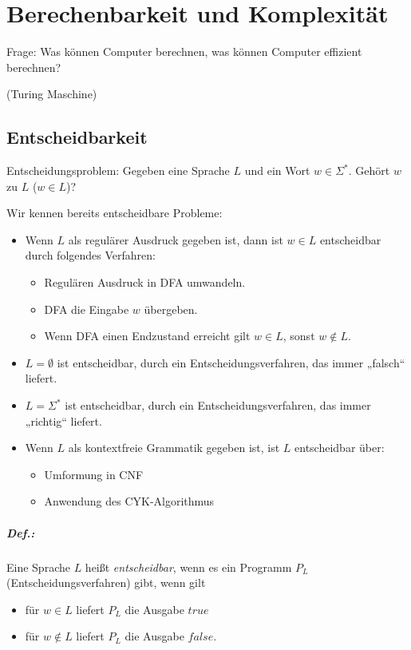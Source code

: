 \chapter{Berechenbarkeit und Komplexität}
Frage: Was können Computer berechnen, was können Computer effizient berechnen?\\
 (Turing Maschine)
\section{Entscheidbarkeit}
Entscheidungsproblem: Gegeben eine Sprache $L$ und ein Wort $w\in \Sigma^*$. Gehört $w$ zu $L$ ($w\in L$)?

Wir kennen bereits entscheidbare Probleme:
\begin{itemize}
\item Wenn $L$ als regulärer Ausdruck gegeben ist, dann ist $w\in L$ entscheidbar durch folgendes Verfahren: 
\begin{itemize}
\item Regulären Ausdruck in DFA umwandeln.
\item DFA die Eingabe $w$ übergeben.
\item Wenn DFA einen Endzustand erreicht gilt $w\in L$, sonst $w\not \in L$.
\end{itemize}
\item $L=\emptyset$ ist entscheidbar, durch ein Entscheidungsverfahren, das immer „falsch“ liefert.
\item $L=\Sigma^*$ ist entscheidbar, durch ein Entscheidungsverfahren, das immer „richtig“ liefert.
\item Wenn $L$ als kontextfreie Grammatik gegeben ist, ist $L$ entscheidbar über:
\begin{itemize}
\item Umformung in CNF
\item Anwendung des CYK-Algorithmus
\end{itemize}
\end{itemize}

\paragraph{Def.:} Eine Sprache $L$ heißt \emph{entscheidbar}, wenn es ein Programm $P_L$ (Entscheidungsverfahren) gibt, wenn gilt
\begin{itemize}
\item für $w\in L$ liefert $P_L$ die Ausgabe $true$
\item für $w \not \in L$ liefert $P_L$ die Ausgabe $false$.
\end{itemize}

